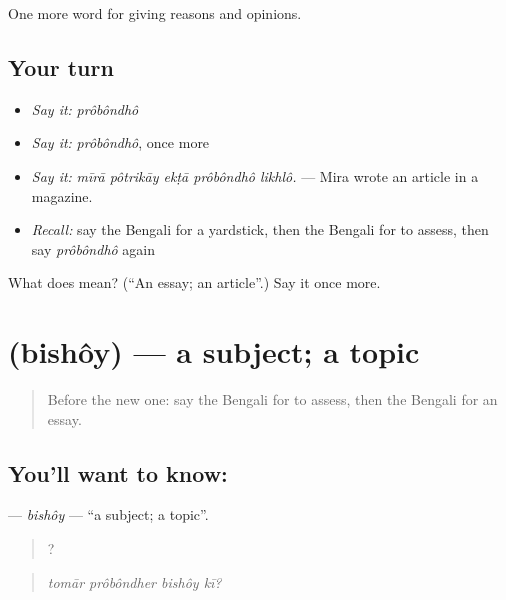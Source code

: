 \begin{grammarlens}[title={What you've built}]
One more word for giving reasons and opinions.
\end{grammarlens}

\subsection*{Your turn}
\begin{itemize}
\raggedright
  \item \emph{Say it:} \emph{prôbôndhô}
  \item \emph{Say it:} \emph{prôbôndhô}, once more
  \item \emph{Say it:} \emph{mīrā pôtrikāy ekṭā prôbôndhô likhlô.} — Mira wrote an article in a magazine.
  \item \emph{Recall:} say the Bengali for a yardstick, then the Bengali for to assess, then say \emph{prôbôndhô} again
\end{itemize}

\begin{tcolorbox}[breakable,colback=teal!4,colframe=teal!35!black,title={Before you move on}]
What does  mean? (\textquotedblleft{}An essay; an article\textquotedblright{}.) Say it once more.
\end{tcolorbox}
\section[\texorpdfstring{\bn{বিষয়} (bishôy)}{বিষয় (bishôy)}]{ (bishôy) — a subject; a topic}

\label{lesson:BN-C357-bishoy}



\begin{quote}
Before the new one: say the Bengali for to assess, then the Bengali for an essay.
\end{quote}

\subsection*{You'll want to know: }
\textbf{} — \emph{bishôy} — \textquotedblleft{}a subject; a topic\textquotedblright{}.

\begin{quote}
   ?
\end{quote}

\begin{quote}
\emph{tomār prôbôndher bishôy kī?}
\end{quote}

